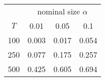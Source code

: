 % 
\begin{tabular}{cccc}
  \hline
  & \multicolumn{3}{c}{nominal size $\alpha$} \\
 $T$ & 0.01 & 0.05 & 0.1 \\
 \hline
100 & 0.003 & 0.017 & 0.054 \\ 
  250 & 0.077 & 0.175 & 0.257 \\ 
  500 & 0.425 & 0.605 & 0.694 \\ 
   \hline
\end{tabular}
